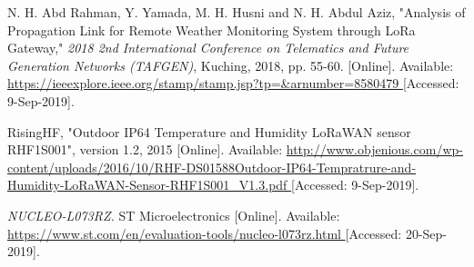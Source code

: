 \begin{thebibliography}{9}









N. H. Abd Rahman, Y. Yamada, M. H. Husni and N. H. Abdul Aziz, "Analysis of Propagation Link for Remote Weather Monitoring System through LoRa Gateway," \textit{2018 2nd International Conference on Telematics and Future Generation Networks (TAFGEN)}, Kuching, 2018, pp. 55-60.
[Online]. Available:
\url{
https://ieeexplore.ieee.org/stamp/stamp.jsp?tp=&arnumber=8580479
}
[Accessed: 9-Sep-2019].


RisingHF, "Outdoor IP64 Temperature and Humidity LoRaWAN sensor RHF1S001", version 1.2, 2015
[Online]. Available:
\url{
http://www.objenious.com/wp-content/uploads/2016/10/RHF-DS01588Outdoor-IP64-Tempratrure-and-Humidity-LoRaWAN-Sensor-RHF1S001_V1.3.pdf
}
[Accessed: 9-Sep-2019].




\textit{
NUCLEO-L073RZ.
}
ST Microelectronics
[Online]. Available:
\url{
https://www.st.com/en/evaluation-tools/nucleo-l073rz.html
}
[Accessed: 20-Sep-2019].



\end{thebibliography}
